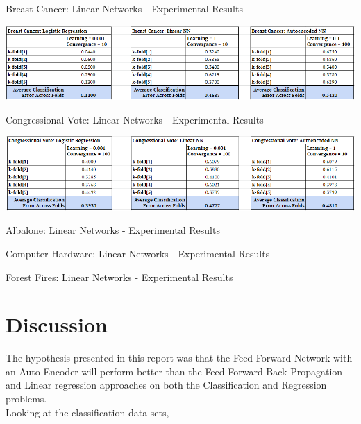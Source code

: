 \documentclass[twoside,11pt]{article}
\begin{document}
\begin{table}[h]
		\centering
		\caption{Breast Cancer: Linear Networks - Experimental Results}
		\label{tab:table2}
		\includegraphics[scale=.7]{BC_All_Results}\newline
\end{table}
\newpage

\begin{table}[h]
		\centering
		\caption{Congressional Vote: Linear Networks - Experimental Results}
		\label{tab:table3}
		\includegraphics[scale=.7]{CongVote_All_Results}\newline
\end{table}

\begin{table}[h]
	\centering
	\caption{Albalone: Linear Networks - Experimental Results}
	\label{tab:table4}
\end{table}

\begin{table}[h]
	\centering
	\caption{Computer Hardware: Linear Networks - Experimental Results}
	\label{tab:tale5}
\end{table}

\begin{table}[h]
	\centering
	\caption{Forest Fires: Linear Networks - Experimental Results}
	\label{tab:table6}
\end{table}

\newpage
\newpage


\section{Discussion}
\hspace*{10mm} The hypothesis presented in this report was that the  Feed-Forward Network with an Auto Encoder will perform better than the Feed-Forward Back Propagation and Linear regression approaches on both the Classification and Regression problems.\\
\hspace*{10mm} Looking at the classification data sets,  \\
\end{document}
